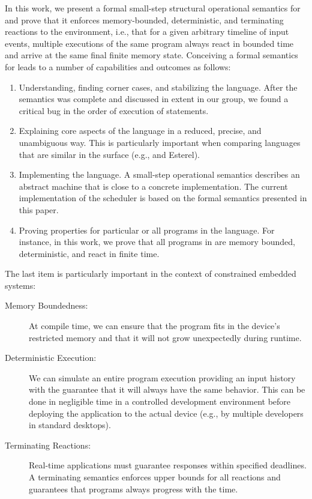 In this work, we present a formal small-step structural operational
semantics for \CEU and prove that it enforces memory-bounded, deterministic,
and terminating reactions to the environment, i.e., that for a given
arbitrary timeline of input events, multiple executions of the same program
always react in bounded time and arrive at the same final finite memory
state.
%
Conceiving a formal semantics for \CEU leads to a number of capabilities and
outcomes as follows:

\begin{enumerate}
\item
    Understanding, finding corner cases, and stabilizing the language.
    After the semantics was complete and discussed in extent in our group, we
    found a critical bug in the order of execution of statements.
\item
    Explaining core aspects of the language in a reduced, precise, and
    unambiguous way.
    This is particularly important when comparing languages that are similar in
    the surface (e.g., \CEU and Esterel).
\item
    Implementing the language.
    A small-step operational semantics describes an abstract machine that is
    close to a concrete implementation.
    The current implementation of the \CEU scheduler is based on the formal
    semantics presented in this paper.
\item
    Proving properties for particular or all programs in the language.
    For instance, in this work, we prove that all programs in \CEU are memory
    bounded, deterministic, and react in finite time.
\end{enumerate}

The last item is particularly important in the context of constrained embedded
systems:

\begin{description}
\item[Memory Boundedness:]
At compile time, we can ensure that the program fits in the device's restricted
memory and that it will not grow unexpectedly during runtime.
\item[Deterministic Execution:]
We can simulate an entire program execution providing an input history with the
guarantee that it will always have the same behavior.
This can be done in negligible time in a controlled development environment
before deploying the application to the actual device (e.g., by multiple
developers in standard desktops).
\item[Terminating Reactions:]
Real-time applications must guarantee responses within specified deadlines.
A terminating semantics enforces upper bounds for all reactions and guarantees
that programs always progress with the time.
\end{description}

